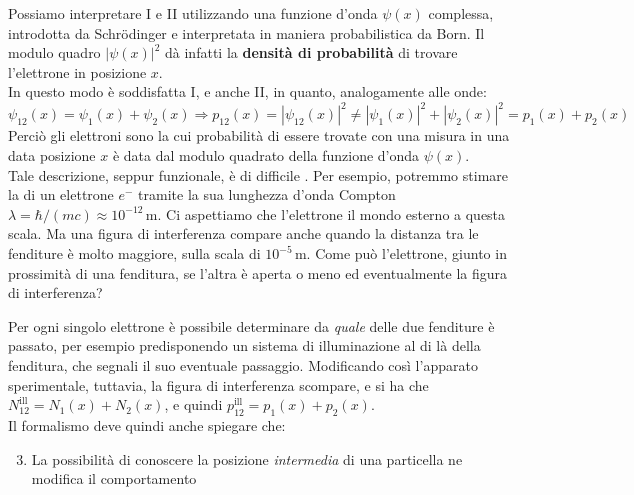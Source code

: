 \documentclass[FisicaTeorica.tex]{subfiles}
\begin{document}
Possiamo interpretare I e II utilizzando una funzione d'onda $\psi(x)$ complessa, introdotta da Schrödinger e interpretata in maniera probabilistica da Born. Il modulo quadro $|\psi(x)|^2$ dà infatti la \textbf{densità di probabilità} di trovare l'elettrone in posizione $x$.\\
In questo modo è soddisfatta I, e anche II, in quanto, analogamente alle onde:
\[
\psi_{12}(x) = \psi_1(x) + \psi_2(x) \Rightarrow p_{12}(x) = |\psi_{12}(x)|^2 \neq |\psi_1(x)|^2 + |\psi_2(x)|^2 = p_1(x) + p_2(x)
\]
Perciò gli elettroni sono  la cui probabilità di essere trovate con una misura in una data posizione $x$ è data dal modulo quadrato della funzione d'onda $\psi(x)$.\\
Tale descrizione, seppur funzionale, è di difficile . Per esempio, potremmo stimare la  di un elettrone $e^-$ tramite la sua lunghezza d'onda Compton $\lambda = \hbar/(mc) \approx 10^{-12} \, \mathrm{m}$. Ci aspettiamo che l'elettrone  il mondo esterno a questa scala. Ma una figura di interferenza compare anche quando la distanza tra le fenditure è molto maggiore, sulla scala di $10^{-5} \, \mathrm{m}$. Come può l'elettrone, giunto in prossimità di una fenditura,  se l'altra è aperta o meno ed eventualmente  la figura di interferenza?

Per ogni singolo elettrone è possibile determinare da \textit{quale} delle due fenditure è passato, per esempio predisponendo un sistema di illuminazione al di là della fenditura, che segnali il suo eventuale passaggio. Modificando così l'apparato sperimentale, tuttavia, la figura di interferenza scompare, e si ha che $N_{12}^\text{ill} = N_1(x) + N_2(x)$, e quindi $p_{12}^\text{ill} = p_1(x) + p_2(x)$.\\
Il formalismo deve quindi anche spiegare che:
\begin{enumerate}[label=\Roman*.]
\setcounter{enumi}{2}
    \item La possibilità  di conoscere la posizione \textit{intermedia} di una particella ne modifica il comportamento
\end{enumerate}
\end{document}
